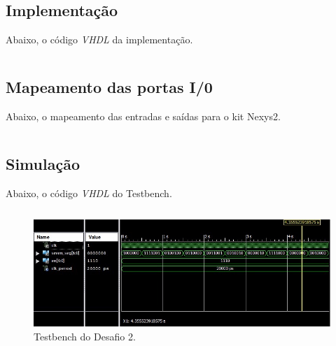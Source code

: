 \documentclass[12pt]{article}
\begin{document}
\subsection{Implementação}

Abaixo, o código \emph{VHDL} da implementação.

\inputminted{vhdl}{desafio1.vhd}

\subsection{Mapeamento das portas I/0}

Abaixo, o mapeamento das entradas e saídas para o kit Nexys2.

\inputminted{vhdl}{desafio1_pins.ucf}

\subsection{Simulação}

Abaixo, o código \emph{VHDL} do Testbench.

\inputminted{vhdl}{tb_desafio1.vhd}

\begin{figure}[!h]
    \centering
    \includegraphics[width=1.0\textwidth]{tb_desafio1.jpg}
    \caption{Testbench do Desafio 2.}
\end{figure}
\end{document}
